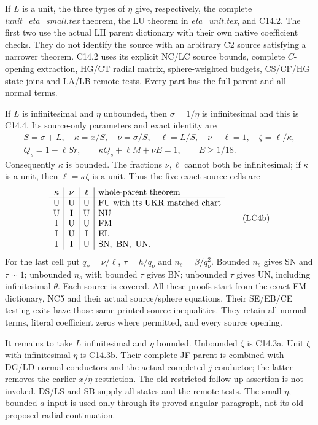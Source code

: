 If \(L\) is a unit, the three types of \(\eta\) give,
respectively, the complete \emph{lunit\_eta\_small.tex}
theorem, the LU theorem in \emph{eta\_unit.tex},
and C14.2.  The first two use the actual LII parent
dictionary with their own native coefficient checks.
They do not identify the source with an arbitrary C2
source satisfying a narrower theorem.
C14.2 uses its explicit NC/LC source bounds,
complete \(C\)-opening extraction, HG/CT radial matrix,
sphere-weighted budgets, CS/CF/HG state joins and LA/LB
remote tests.  Every part has the full parent and all
normal terms.

If \(L\) is infinitesimal and \(\eta\) unbounded, then
\(\sigma=1/\eta\) is infinitesimal and this is C14.4.
Its source-only parameters and exact identity are
\[
\begin{gathered}
 S=\sigma+L,\quad \kappa=x/S,\quad
 \nu=\sigma/S,\quad \ell=L/S,\quad \nu+\ell=1,\quad
 \zeta=\ell/\kappa,\\
 Q_s=1-\ell Sr,\qquad
 \kappa Q_s+\ell M+\nu E=1,\qquad E\geq1/18.
\end{gathered}\tag{LC4a}
\]
Consequently \(\kappa\) is bounded.  The fractions
\(\nu,\ell\) cannot both be infinitesimal; if \(\kappa\)
is a unit, then \(\ell=\kappa\zeta\) is a unit.
Thus the five exact source cells are
\[
\begin{array}{c|c|c|l}
\kappa&\nu&\ell&\text{whole-parent theorem}\\ \hline
{\rm U}&{\rm U}&{\rm U}&{\rm FU}\text{ with its UKR matched chart}\\
{\rm U}&{\rm I}&{\rm U}&{\rm NU}\\
{\rm I}&{\rm U}&{\rm U}&{\rm FM}\\
{\rm I}&{\rm U}&{\rm I}&{\rm EL}\\
{\rm I}&{\rm I}&{\rm U}&{\rm SN,\ BN,\ UN}.
\end{array}\tag{LC4b}
\]
For the last cell put \(q_\nu=\nu/\ell\),
\(\tau=h/q_\nu\) and \(n_s=\beta/q_\nu^2\).
Bounded \(n_s\) gives SN and \(\tau\sim1\);
unbounded \(n_s\) with bounded \(\tau\) gives BN;
unbounded \(\tau\) gives UN, including infinitesimal
\(\theta\).  Each source is covered.
All these proofs start from the exact FM dictionary,
NC5 and their actual source/sphere equations.
Their SE/EB/CE testing exits have those same printed
source inequalities.  They retain all normal terms,
literal coefficient zeros where permitted, and every
source opening.

It remains to take \(L\) infinitesimal and \(\eta\)
bounded.  Unbounded \(\zeta\) is C14.3a.
Unit \(\zeta\) with infinitesimal \(\eta\) is C14.3b.
Their complete JF parent is combined with DG/LD normal
conductors and the actual completed \(j\) conductor;
the latter removes the earlier \(x/\eta\) restriction.
The old restricted follow-up assertion is not invoked.
DS/LS and SB supply all states and the remote tests.
The small-\(\eta\), bounded-\(a\) input is used only
through its proved angular paragraph, not its old
proposed radial continuation.

